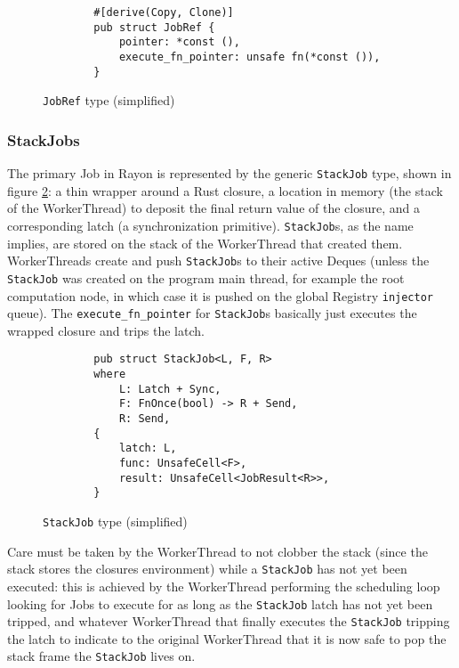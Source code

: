 \documentclass[bsc,frontabs,singlespacing,parskip,deptreport,normalheadings]{infthesis}
\begin{document}
\begin{figure}[ht]
    \begin{verbatim}
        #[derive(Copy, Clone)]
        pub struct JobRef {
            pointer: *const (),
            execute_fn_pointer: unsafe fn(*const ()),
        }
    \end{verbatim}
    \caption{\texttt{JobRef} type (simplified)}
    \label{fig:job_ref}
\end{figure}

\subsubsection*{StackJobs}

The primary Job in Rayon is represented by the generic \texttt{StackJob} type,
shown in figure \ref{fig:stackjob}: a thin wrapper around a Rust closure, a
location in memory (the stack of the WorkerThread) to deposit the final return
value of the closure, and a corresponding latch (a synchronization primitive).
\texttt{StackJob}s, as the name implies, are stored on the stack of the
WorkerThread that created them. WorkerThreads create and push \texttt{StackJob}s
to their active Deques (unless the \texttt{StackJob} was created on the program
main thread, for example the root computation node, in which case it is pushed
on the global Registry \texttt{injector} queue). The
\texttt{execute\_fn\_pointer} for \texttt{StackJob}s basically just executes the
wrapped closure and trips the latch.

\begin{figure}[ht]
    \begin{verbatim}
        pub struct StackJob<L, F, R>
        where
            L: Latch + Sync,
            F: FnOnce(bool) -> R + Send,
            R: Send,
        {
            latch: L,
            func: UnsafeCell<F>,
            result: UnsafeCell<JobResult<R>>,
        }
    \end{verbatim}
    \caption{\texttt{StackJob} type (simplified)}
    \label{fig:stackjob}
\end{figure}

Care must be taken by the WorkerThread to not clobber the stack (since the stack
stores the closures environment) while a \texttt{StackJob} has not yet been
executed: this is achieved by the WorkerThread performing the scheduling loop
looking for Jobs to execute for as long as the \texttt{StackJob} latch has not
yet been tripped, and whatever WorkerThread that finally executes the
\texttt{StackJob} tripping the latch to indicate to the original WorkerThread
that it is now safe to pop the stack frame the \texttt{StackJob} lives on.
\end{document}
